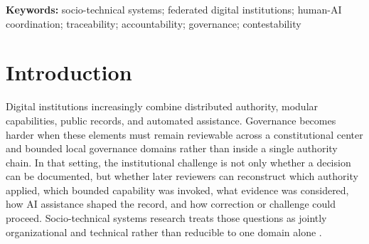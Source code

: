 \documentclass[11pt]{article}
\begin{document}
\begin{abstract}
Human-AI-assisted digital institutions become difficult to govern when
constitutional constraints, bounded local governance domains, modular
capabilities, and review obligations must be coordinated within the same
decision environment. Adjacent literatures on socio-technical systems,
decentralized governance, provenance, accountable algorithms, contestability,
and human-AI interaction provide differently scoped components for examining
this problem. This paper presents Axodus as one proposed integration of those
components: a prototype-stage conceptual architecture for that setting. Its
central contribution is a six-layer governance-oriented model relating a
constitutional center, bounded local governance domains, modular
institutional capabilities, evidence and provenance, bounded AI assistance,
and risk or contestability controls. The six layers are presented as one
defensible conceptual decomposition, not as a necessary, minimal, uniquely
correct, or universally sufficient structure. Traceability and
reconstructability may support accountability and contestability, but do not
establish either property independently. Axodus is described only as a
conceptual, prototype-stage model; the paper reports no deployment, empirical
validation, observed institutional use, or operational readiness.
\end{abstract}

\noindent\textbf{Keywords:} socio-technical systems; federated digital
institutions; human-AI coordination; traceability; accountability;
governance; contestability

\section{Introduction}

Digital institutions increasingly combine distributed authority, modular
capabilities, public records, and automated assistance. Governance becomes
harder when these elements must remain reviewable across a constitutional
center and bounded local governance domains rather than inside a single
authority chain. In that setting, the institutional challenge is not only
whether a decision can be documented, but whether later reviewers can
reconstruct which authority applied, which bounded capability was invoked,
what evidence was considered, how AI assistance shaped the record, and how
correction or challenge could proceed. Socio-technical systems
research treats those questions as jointly organizational and technical rather
than reducible to one domain alone \citep{baxter2011sociotechnical}.
\end{document}
